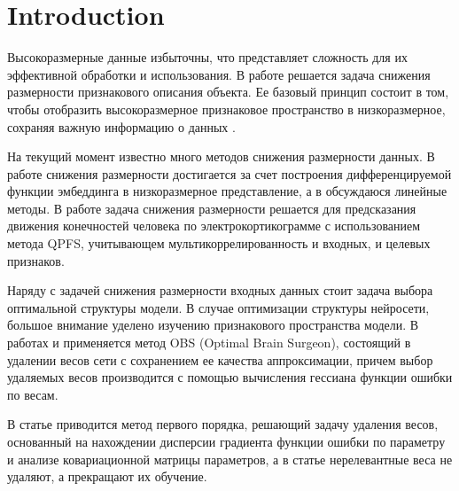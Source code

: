 \documentclass{article}
\begin{document}


\section{Introduction}







Высокоразмерные данные избыточны, что представляет сложность для их эффективной обработки и использования. В работе решается задача снижения размерности признакового описания объекта.
Ее базовый принцип состоит в том, чтобы отобразить высокоразмерное признаковое пространство в низкоразмерное, сохраняя важную информацию о данных \citep{jia2022feature}.

На текущий момент известно много методов снижения размерности данных. В работе \citep{ornek2019nonlinear} снижения размерности достигается за счет построения дифференцируемой функции эмбеддинга в низкоразмерное представление, а в \citep{cunningham2014dimensionality} обсуждаюся линейные методы. В работе \citep{isachenko2022quadratic} задача снижения размерности решается для предсказания движения конечностей человека по электрокортикограмме с использованием  метода QPFS, учитывающем мультикоррелированность и входных, и целевых признаков.

Наряду с задачей снижения размерности входных данных стоит задача выбора оптимальной структуры модели. В случае оптимизации структуры нейросети, большое внимание уделено изучению признакового пространства модели. В работах \citep{hassibi1993optimal} и \citep{dong2017learning} применяется метод OBS (Optimal Brain Surgeon), состоящий в удалении весов сети с сохранением ее качества аппроксимации, причем выбор удаляемых весов производится с помощью вычисления гессиана функции ошибки по весам.

В статье \citep{грабовой2019определение} приводится метод первого порядка, решающий задачу удаления весов, основанный на нахождении дисперсии градиента функции ошибки по параметру и анализе ковариационной матрицы параметров, а в статье \citep{грабовой2020введение} нерелевантные веса не удаляют, а прекращают их обучение.
\end{document}
